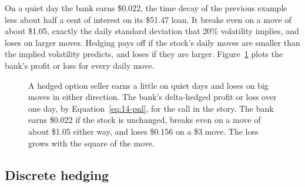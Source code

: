 On a quiet day the bank earns \$0.022, the time decay of the previous example less about half a cent of interest on its \$51.47 loan. It breaks even on a move of about \$1.05, exactly the daily standard deviation that 20\% volatility implies, and loses on larger moves. Hedging pays off if the stock's daily moves are smaller than the implied volatility predicts, and loses if they are larger. Figure~\ref{fig:14-pnl} plots the bank's profit or loss for every daily move.

\begin{figure}[htbp]
\centering
{}
\caption{A hedged option seller earns a little on quiet days and loses on big moves in either direction. The bank's delta-hedged profit or loss over one day, by Equation~\eqref{eq:14-pnl}, for the call in the story. The bank earns \$0.022 if the stock is unchanged, breaks even on a move of about \$1.05 either way, and loses \$0.156 on a \$3 move. The loss grows with the square of the move.}
\label{fig:14-pnl}
\end{figure}



\subsection{Discrete hedging}

